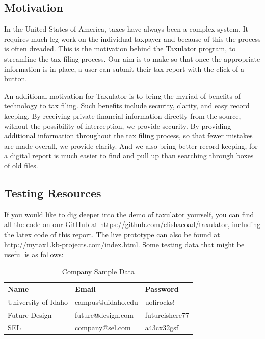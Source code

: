 \documentclass[sigconf]{acmart}
\begin{document}
\subsection{Motivation}
In the United States of America, taxes have always been a complex system. It requires much leg work on the individual taxpayer and because of this the process is often dreaded. This is the motivation behind the Taxulator program, to streamline the tax filing process. Our aim is to make so that once the appropriate information is in place, a user can submit their tax report with the click of a button.

An additional motivation for Taxulator is to bring the myriad of benefits of technology to tax filing. Such benefits include security, clarity, and easy record keeping. By receiving private financial information directly from the source, without the possibility of interception, we provide security. By providing additional information throughout the tax filing process, so that fewer mistakes are made overall, we provide clarity. And we also bring better record keeping, for a digital report is much easier to find and pull up than searching through boxes of old files.

\subsection{Testing Resources}
If you would like to dig deeper into the demo of taxulator yourself, you can find all the code on our GitHub at \url{https://github.com/elishacoad/taxulator}, including the latex code of this report. The live prototype can also be found at \url{http://mytax1.kb-projects.com/index.html}. Some testing data that might be useful is as follows:

\begin{table}[H]
\begin{center}
  \caption{Company Sample Data}
\begin{tabularx}{0.45\textwidth} { | m{2cm} | m{3cm} | m{1.9cm} | }
 \hline
 Name & Email & Password \\
 \hline
 \hline
 University of Idaho & campus@uidaho.edu & uofirocks!\\
 \hline
 Future Design & future@design.com & futureishere77\\
 \hline
 SEL & company@sel.com & a43cx32gsf\\
\end{tabularx}
\end{center}
\end{table}
\end{document}
